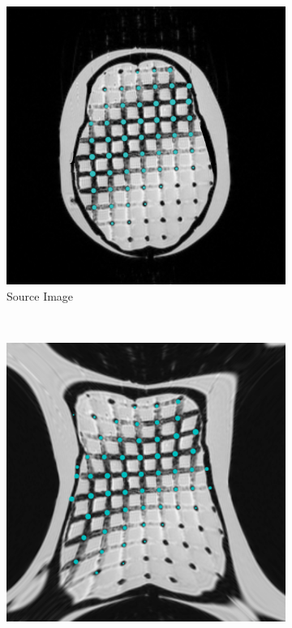 \documentclass[12pt]{article}
\begin{document}
\begin{figure}
    \centering
    \begin{subfigure}[b]{0.48\textwidth}
        \centering
        \includegraphics[width=\textwidth]{source-image.png}
        \caption{Source Image}
        \label{fig:test-case_1}
    \end{subfigure}%
    ~
    \begin{subfigure}[b]{0.48\textwidth}
        \centering
        \includegraphics[width=\textwidth]{distorted-image.png}

\end{subfigure}
\end{figure}
\end{document}

